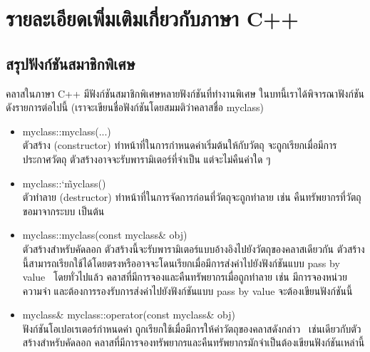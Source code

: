 \section{รายละเอียด{\wbr}เพิ่มเติม{\wbr}เกี่ยวกับ{\wbr}ภาษา C++}

\subsection{สรุป{\wbr}ฟังก์ชัน{\wbr}สมาชิกพิเศษ}

ค{\wbr}ลา{\wbr}ส{\wbr}ใน{\wbr}ภาษา C++ มี{\wbr}ฟังก์ชัน{\wbr}สมาชิกพิเศษ{\wbr}หลาย{\wbr}ฟังก์ชัน{\wbr}ที่ทำงาน{\wbr}พิเศษ ใน{\wbr}บท{\wbr}นี้{\wbr}เรา{\wbr}ได้{\wbr}พิจารณา{\wbr}ฟังก์ชัน{\wbr}ดัง{\wbr}รายการ{\wbr}ต่อไปนี้ (เรา{\wbr}จะ{\wbr}เขียน{\wbr}ชื่อ{\wbr}ฟังก์ชัน{\wbr}โดย{\wbr}สมมติ{\wbr}ว่า{\wbr}ค{\wbr}ลา{\wbr}ส{\wbr}ชื่อ {\ct myclass})
\begin{itemize}
\item {\ct myclass::myclass(...)} \\ ตัว{\wbr}สร้าง (constructor)
  ทำ{\wbr}หน้าที่{\wbr}ใน{\wbr}การ{\wbr}กำหนด{\wbr}ค่า{\wbr}เริ่มต้น{\wbr}ให้{\wbr}กับ{\wbr}วัตถุ จะ{\wbr}ถูก{\wbr}เรียก{\wbr}เมื่อ{\wbr}มี{\wbr}การ{\wbr}ประกาศ{\wbr}วัตถุ{\wbr}
  ตัว{\wbr}สร้าง{\wbr}อาจ{\wbr}จะ{\wbr}รับ{\wbr}พารามิเตอร์{\wbr}ที่{\wbr}จำเป็น แต่{\wbr}จะ{\wbr}ไม่{\wbr}คืน{\wbr}ค่า{\wbr}ใด ๆ
\item {\ct myclass::\char`\~myclass()} \\ ตัว{\wbr}ทำลาย (destructor)
  ทำ{\wbr}หน้าที่{\wbr}ใน{\wbr}การ{\wbr}จัดการ{\wbr}ก่อน{\wbr}ที่{\wbr}วัตถุ{\wbr}จะ{\wbr}ถูก{\wbr}ทำลาย เช่น คืน{\wbr}ทรัพยากร{\wbr}ที่{\wbr}วัตถุ{\wbr}ขอ{\wbr}มา{\wbr}จาก{\wbr}ระบบ เป็นต้น{\wbr}
\item {\ct myclass::myclass(const myclass\& obj)} \\ ตัว{\wbr}สร้าง{\wbr}สำหรับ{\wbr}คัดลอก{\wbr}
  ตัว{\wbr}สร้าง{\wbr}นี้{\wbr}จะ{\wbr}รับ{\wbr}พารามิเตอร์{\wbr}แบบ{\wbr}อ้างอิง{\wbr}ไป{\wbr}ยัง{\wbr}วัตถุ{\wbr}ของ{\wbr}ค{\wbr}ลา{\wbr}ส{\wbr}เดียวกัน{\wbr}
  ตัว{\wbr}สร้าง{\wbr}นี้{\wbr}สามารถ{\wbr}เรียก{\wbr}ใช้ได้{\wbr}โดย{\wbr}ตรง{\wbr}หรือ{\wbr}อาจ{\wbr}จะ{\wbr}โดน{\wbr}เรียก{\wbr}เมื่อ{\wbr}มี{\wbr}การ{\wbr}ส่ง{\wbr}ค่า{\wbr}ไป{\wbr}ยัง{\wbr}ฟังก์ชัน{\wbr}แบบ{\wbr}
  pass by value \ โดย{\wbr}ทั่วไป{\wbr}แล้ว ค{\wbr}ลา{\wbr}ส{\wbr}ที่{\wbr}มี{\wbr}การ{\wbr}จอง{\wbr}และ{\wbr}คืน{\wbr}ทรัพยากร{\wbr}เมื่อ{\wbr}ถูก{\wbr}ทำลาย เช่น{\wbr}
  มี{\wbr}การ{\wbr}จอง{\wbr}หน่วยความจำ และ{\wbr}ต้องการ{\wbr}รองรับ{\wbr}การ{\wbr}ส่ง{\wbr}ค่า{\wbr}ไป{\wbr}ยัง{\wbr}ฟังก์ชัน{\wbr}แบบ pass by value
  จะ{\wbr}ต้อง{\wbr}เขียน{\wbr}ฟังก์ชัน{\wbr}นี้{\wbr}
\item {\ct myclass\& myclass::operator(const myclass\& obj)}
  \\ ฟังก์ชัน{\wbr}โอ{\wbr}เปอเรเตอร์{\wbr}กำหนด{\wbr}ค่า ถูก{\wbr}เรียก{\wbr}ใช้{\wbr}เมื่อ{\wbr}มี{\wbr}การ{\wbr}ให้{\wbr}ค่า{\wbr}วัตถุ{\wbr}ของ{\wbr}ค{\wbr}ลา{\wbr}ส{\wbr}ดังกล่าว{\wbr}
  \ เช่นเดียวกับ{\wbr}ตัว{\wbr}สร้าง{\wbr}สำหรับ{\wbr}คัดลอก{\wbr}
  ค{\wbr}ลา{\wbr}ส{\wbr}ที่{\wbr}มี{\wbr}การ{\wbr}จอง{\wbr}ทรัพยากร{\wbr}และ{\wbr}คืน{\wbr}ทรัพยากร{\wbr}มัก{\wbr}จำเป็น{\wbr}ต้อง{\wbr}เขียน{\wbr}ฟังก์ชัน{\wbr}เหล่านี้{\wbr}
\end{itemize}

